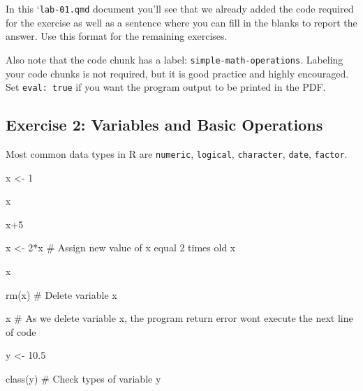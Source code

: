 \documentclass[
  letterpaper,
  DIV=11,
  numbers=noendperiod]{scrartcl}
\newenvironment{Shaded}{\begin{snugshade}}{\end{snugshade}}
\newcommand{\CommentTok}[1]{\textcolor[rgb]{0.37,0.37,0.37}{#1}}
\newcommand{\DecValTok}[1]{\textcolor[rgb]{0.68,0.00,0.00}{#1}}
\newcommand{\FloatTok}[1]{\textcolor[rgb]{0.68,0.00,0.00}{#1}}
\newcommand{\FunctionTok}[1]{\textcolor[rgb]{0.28,0.35,0.67}{#1}}
\newcommand{\NormalTok}[1]{\textcolor[rgb]{0.00,0.23,0.31}{#1}}
\newcommand{\OtherTok}[1]{\textcolor[rgb]{0.00,0.23,0.31}{#1}}
\newcommand{\SpecialCharTok}[1]{\textcolor[rgb]{0.37,0.37,0.37}{#1}}
\begin{document}
\begin{tcolorbox}[enhanced jigsaw, colframe=quarto-callout-note-color-frame, opacitybacktitle=0.6, coltitle=black, colback=white, rightrule=.15mm, leftrule=.75mm, opacityback=0, left=2mm, colbacktitle=quarto-callout-note-color!10!white, breakable, toptitle=1mm, bottomtitle=1mm, titlerule=0mm, bottomrule=.15mm, toprule=.15mm, arc=.35mm, title=\textcolor{quarto-callout-note-color}{\faInfo}\hspace{0.5em}{Note}]

In this `\texttt{lab-01.qmd\textasciigrave{}} document you'll see that
we already added the code required for the exercise as well as a
sentence where you can fill in the blanks to report the answer. Use this
format for the remaining exercises.

Also note that the code chunk has a label:
\texttt{simple-math-operations}. Labeling your code chunks is not
required, but it is good practice and highly encouraged. Set
\texttt{eval:\ true} if you want the program output to be printed in the
PDF.

\end{tcolorbox}

\subsection{Exercise 2: Variables and Basic
Operations}\label{exercise-2-variables-and-basic-operations}

Most common data types in R are \texttt{numeric}, \texttt{logical},
\texttt{character}, \texttt{date}, \texttt{factor}.

\begin{Shaded}
\begin{Highlighting}[]
\NormalTok{x }\OtherTok{\textless{}{-}} \DecValTok{1}

\NormalTok{x}

\NormalTok{x}\SpecialCharTok{+}\DecValTok{5}

\NormalTok{x }\OtherTok{\textless{}{-}} \DecValTok{2}\SpecialCharTok{*}\NormalTok{x }\CommentTok{\# Assign new value of x equal 2 times old x}

\NormalTok{x}

\FunctionTok{rm}\NormalTok{(x) }\CommentTok{\# Delete variable x}

\NormalTok{x }\CommentTok{\# As we delete variable x, the program return error won\textquotesingle{}t execute the next line of code}

\NormalTok{y }\OtherTok{\textless{}{-}} \FloatTok{10.5}

\FunctionTok{class}\NormalTok{(y) }\CommentTok{\# Check types of variable y}
\end{Highlighting}
\end{Shaded}
\end{document}
